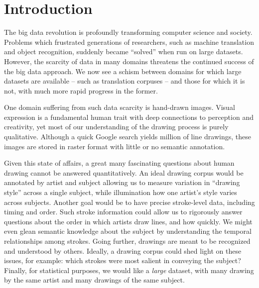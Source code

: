 \section{Introduction}

The big data revolution is profoundly transforming computer science
and society. Problems which frustrated generations of researchers,
such as machine translation and object recognition, suddenly became
``solved'' when run on large datasets. However, the scarcity of data
in many domains threatens the continued success of the big data
approach. We now see a schism between domains for which large
datasets are available – such as translation corpuses – and
those for which it is not, with much more rapid progress in the
former.

One domain suffering from such data scarcity is hand-drawn images.
Visual expression is a fundamental human trait with deep connections
to perception and creativity, yet most of our understanding of the
drawing process is purely qualitative. Although a quick Google
search yields million of line drawings, these images are stored in
raster format with little or no semantic annotation.

Given this state of affairs, a great many fascinating questions
about human drawing cannot be answered quantitatively. An ideal
drawing corpus would be annotated by artist and subject allowing us
to measure variation in ``drawing style'' across a single subject,
while illumination how one artist's style varies across subjects.
Another goal would be to have precise stroke-level data, including
timing and order. Such stroke information could allow us to
rigorously answer questions about the order in which artists draw
lines, and how quickly. We might even glean semantic knowledge about
the subject by understanding the temporal relationships among
strokes. Going further, drawings are meant to be recognized and
understood by others. Ideally, a drawing corpus could shed light on
these issues, for example: which strokes were most salient in
conveying the subject? Finally, for statistical purposes, we would
like a \emph{large} dataset, with many drawing by the same artist
and many drawings of the same subject.

